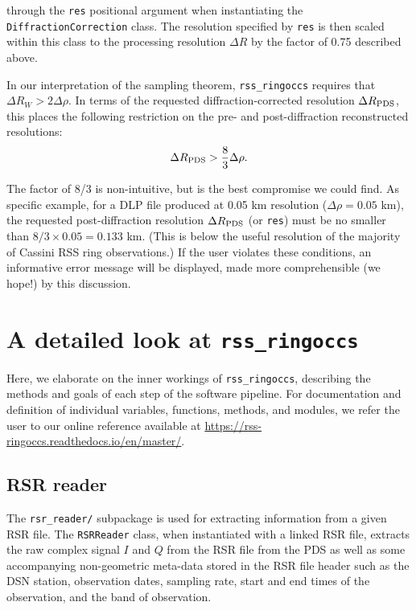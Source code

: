 \documentclass[titlepage, 12pt]{article}
\begin{document}
        through the \texttt{res} positional 
        argument when instantiating the \texttt{DiffractionCorrection} class. The 
        resolution specified by \texttt{res} is then scaled within this class
        to the processing 
        resolution $\Delta R$ by the factor of 0.75 described above. 
        \par\hfill\par
        In our interpretation of the sampling theorem, \texttt{rss\_ringoccs} requires that $\Delta R_W > 2\Delta\rho$. In terms of the requested diffraction-corrected resolution $\Delta R_{\rm PDS}$, this places the following restriction on the pre- and post-diffraction reconstructed resolutions:
        $$\Delta R_{\rm PDS}> \frac{8}{3}\Delta\rho.$$
        \par\hfill\par
        The factor of 8/3 is non-intuitive, but is the best compromise we could find. As  specific example, for a DLP file produced at 0.05 km resolution ($\Delta\rho=0.05$ km), the requested post-diffraction resolution $\Delta R_{\rm PDS}$ (or \texttt{res}) must be no smaller than $8/3\times0.05 = 0.133$ km. (This is below the useful resolution of the majority of Cassini RSS ring observations.) If the user violates these conditions, an informative error message will be displayed, made more comprehensible (we hope!) by this  discussion.
    \section{A detailed look at \texttt{rss\_ringoccs}}\label{sec:detailedlook}
        Here, we elaborate on the inner workings of \texttt{rss\_ringoccs},
        describing the methods and goals of each step of the software pipeline.
        For documentation and definition of individual variables, functions,
        methods, and modules, we refer the user to our online reference available
        at \url{https://rss-ringoccs.readthedocs.io/en/master/}.
        \subsection{RSR reader}
            The \texttt{rsr\_reader/} subpackage is used
            for extracting information from a given RSR file.
            The \texttt{RSRReader} class, when instantiated with
            a linked RSR file, extracts the raw complex signal $I$
            and $Q$  from the RSR file from the PDS as well as some
            accompanying non-geometric meta-data stored in the RSR
            file header such as the DSN station, observation dates,
            sampling rate, start and end times of the observation,
            and the band of observation.
\end{document}
